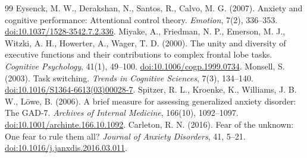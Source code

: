\documentclass[11pt,a4paper]{article}
\begin{document}
\begin{thebibliography}{99}
 Eysenck, M. W., Derakshan, N., Santos, R., Calvo, M. G. (2007). Anxiety and cognitive performance: Attentional control theory. \textit{Emotion}, 7(2), 336--353. \href{https://doi.org/10.1037/1528-3542.7.2.336}{doi:10.1037/1528-3542.7.2.336}.
 Miyake, A., Friedman, N. P., Emerson, M. J., Witzki, A. H., Howerter, A., Wager, T. D. (2000). The unity and diversity of executive functions and their contributions to complex frontal lobe tasks. \textit{Cognitive Psychology}, 41(1), 49--100. \href{https://doi.org/10.1006/cogp.1999.0734}{doi:10.1006/cogp.1999.0734}.
 Monsell, S. (2003). Task switching. \textit{Trends in Cognitive Sciences}, 7(3), 134--140. \href{https://doi.org/10.1016/S1364-6613(03)00028-7}{doi:10.1016/S1364-6613(03)00028-7}.
 Spitzer, R. L., Kroenke, K., Williams, J. B. W., Löwe, B. (2006). A brief measure for assessing generalized anxiety disorder: The GAD-7. \textit{Archives of Internal Medicine}, 166(10), 1092--1097. \href{https://doi.org/10.1001/archinte.166.10.1092}{doi:10.1001/archinte.166.10.1092}.
 Carleton, R. N. (2016). Fear of the unknown: One fear to rule them all? \textit{Journal of Anxiety Disorders}, 41, 5--21. \href{https://doi.org/10.1016/j.janxdis.2016.03.011}{doi:10.1016/j.janxdis.2016.03.011}.


\end{thebibliography}
\end{document}
